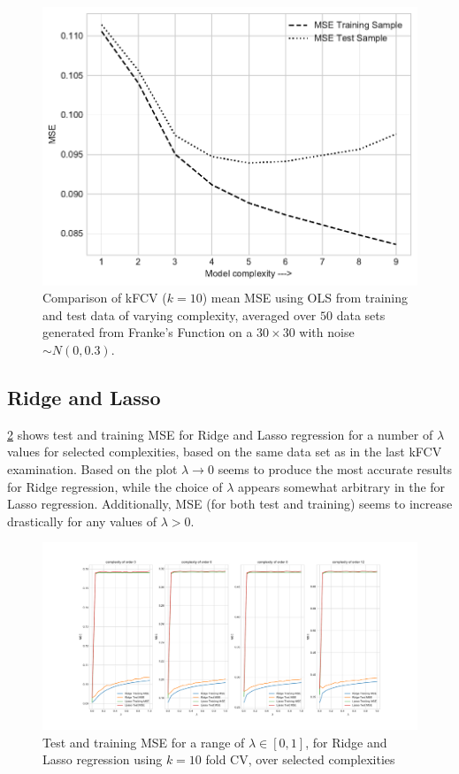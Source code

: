 \documentclass[%
oneside,                 %
final,                   %
10pt]{article}
\begin{document}
\begin{figure}[!h]
        \centering 
         \includegraphics[scale=0.7]{../Results/Part_C/bias_var_50runs.pdf} 
        \caption{Comparison of kFCV ($k=10$) mean MSE using OLS from training and test data of varying complexity, averaged over $50$ data sets generated from Franke's Function on a $30\times 30$ with noise $\sim N(0,0.3)$.}
        \label{fig:bias_var_OLS}   
\end{figure}  



\subsection{Ridge and Lasso}
\ref{fig:ridgelasso_kfold} shows test and training MSE for Ridge and Lasso regression for a number of $\lambda$ values for selected complexities, based on the same data set as in the last kFCV examination. Based on the plot $\lambda \rightarrow 0$ seems to produce the most accurate results for Ridge regression, while the choice of $\lambda$ appears somewhat arbitrary in the for Lasso regression. Additionally, MSE (for both test and training) seems to increase drastically for any values of $\lambda>0$.
\begin{figure}[!h]
        \centering 
         \includegraphics[scale=0.35]{../Results/Part_d/ridgelasso_kfold.pdf} 
        \caption{Test and training MSE for a range of $\lambda \in [0,1]$, for Ridge and Lasso regression using $k=10$ fold CV, over selected complexities}
        \label{fig:ridgelasso_kfold}   
\end{figure}  
\end{document}
